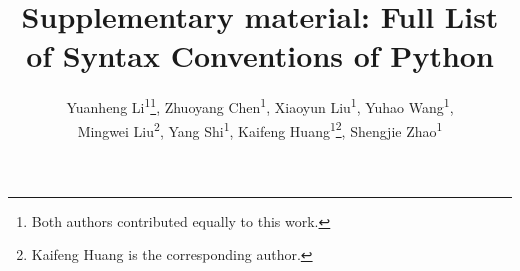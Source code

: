 \documentclass[letterpaper]{article} %
\theoremstyle{acmdefinition}
\begin{document}

\title{Supplementary material: Full List of Syntax Conventions of Python}\label{app:database}


\author{
    Yuanheng Li\textsuperscript{\rm 1}\thanks{Both authors contributed equally to this work.},
    Zhuoyang Chen\textsuperscript{\rm 1}\footnotemark[1],
    Xiaoyun Liu\textsuperscript{\rm 1},
    Yuhao Wang\textsuperscript{\rm 1},\\
    Mingwei Liu\textsuperscript{\rm 2},
    Yang Shi\textsuperscript{\rm 1},
    Kaifeng Huang\textsuperscript{\rm 1}\thanks{Kaifeng Huang is the corresponding author.},
    Shengjie Zhao\textsuperscript{\rm 1}
}


\maketitle
\end{document}
